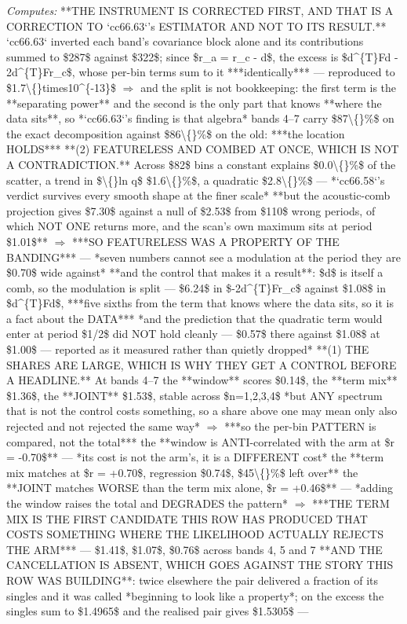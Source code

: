 \begin{description}
\emph{Computes:}  **THE INSTRUMENT IS CORRECTED FIRST, AND THAT IS A CORRECTION TO `cc66.63`'s ESTIMATOR AND NOT TO ITS RESULT.** `cc66.63` inverted each band's covariance block alone and its contributions summed to \$287\$ against \$322\$; since \$r\_a = r\_c - d\$, the excess is \$d\textasciicircum{}\{T\}Fd - 2d\textasciicircum{}\{T\}Fr\_c\$, whose per-bin terms sum to it ***identically*** --- reproduced to \$1.7\textbackslash\{\}times10\textasciicircum{}\{-13\}\$  \ensuremath{\Rightarrow} and the split is not bookkeeping: the first term is the **separating power** and the second is the only part that knows **where the data sits**, so *`cc66.63`'s finding is that algebra*  bands 4--7 carry \$87\textbackslash\{\}\%\$ on the exact decomposition against \$86\textbackslash\{\}\%\$ on the old: ***the location HOLDS***   **(2) FEATURELESS AND COMBED AT ONCE, WHICH IS NOT A CONTRADICTION.** Across \$82\$ bins a constant explains \$0.0\textbackslash\{\}\%\$ of the scatter, a trend in \$\textbackslash\{\}ln q\$ \$1.6\textbackslash\{\}\%\$, a quadratic \$2.8\textbackslash\{\}\%\$ --- *`cc66.58`'s verdict survives every smooth shape at the finer scale*  **but the acoustic-comb projection gives \$7.30\$ against a null of \$2.53\$ from \$110\$ wrong periods, of which NOT ONE returns more, and the scan's own maximum sits at period \$1.01\$**  \ensuremath{\Rightarrow} ***SO FEATURELESS WAS A PROPERTY OF THE BANDING*** --- *seven numbers cannot see a modulation at the period they are \$0.70\$ wide against*   **and the control that makes it a result**: \$d\$ is itself a comb, so the modulation is split --- \$6.24\$ in \$-2d\textasciicircum{}\{T\}Fr\_c\$ against \$1.08\$ in \$d\textasciicircum{}\{T\}Fd\$, ***five sixths from the term that knows where the data sits, so it is a fact about the DATA***   *and the prediction that the quadratic term would enter at period \$1/2\$ did NOT hold cleanly --- \$0.57\$ there against \$1.08\$ at \$1.00\$ --- reported as it measured rather than quietly dropped*   **(1) THE SHARES ARE LARGE, WHICH IS WHY THEY GET A CONTROL BEFORE A HEADLINE.** At bands 4--7 the **window** scores \$0.14\$, the **term mix** \$1.36\$, the **JOINT** \$1.53\$, stable across \$n=1,2,3,4\$   *but ANY spectrum that is not the control costs something, so a share above one may mean only also rejected and not rejected the same way* \ensuremath{\Rightarrow} ***so the per-bin PATTERN is compared, not the total***  the **window is ANTI-correlated with the arm at \$r = -0.70\$** --- *its cost is not the arm's, it is a DIFFERENT cost*  the **term mix matches at \$r = +0.70\$, regression \$0.74\$, \$45\textbackslash\{\}\%\$ left over**  the **JOINT matches WORSE than the term mix alone, \$r = +0.46\$** --- *adding the window raises the total and DEGRADES the pattern*  \ensuremath{\Rightarrow} ***THE TERM MIX IS THE FIRST CANDIDATE THIS ROW HAS PRODUCED THAT COSTS SOMETHING WHERE THE LIKELIHOOD ACTUALLY REJECTS THE ARM*** --- \$1.41\$, \$1.07\$, \$0.76\$ across bands 4, 5 and 7   **AND THE CANCELLATION IS ABSENT, WHICH GOES AGAINST THE STORY THIS ROW WAS BUILDING**: twice elsewhere the pair delivered a fraction of its singles and it was called *beginning to look like a property*; on the excess the singles sum to \$1.4965\$ and the realised pair gives \$1.5305\$ --- 
\end{description}
